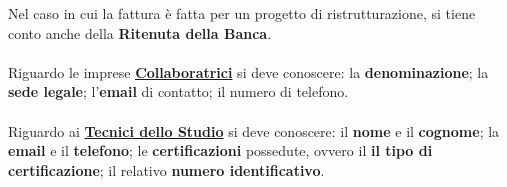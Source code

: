 \documentclass{elegantbook}
\begin{document}
	Nel caso in cui la fattura è fatta per un progetto di ristrutturazione, si tiene conto anche della \textbf{Ritenuta della Banca}.
	\\\\
	
	Riguardo le imprese \underline{\textbf{Collaboratrici}} si deve conoscere: la \textbf{denominazione}; la \textbf{sede legale};	l'\textbf{email} di contatto; il numero di telefono.
	\\\\
	
	Riguardo ai \underline{\textbf{Tecnici dello Studio}} si deve conoscere: il \textbf{nome} e il \textbf{cognome}; la
        \textbf{email} e il \textbf{telefono}; le \textbf{certificazioni} possedute, ovvero il \textbf{il tipo di certificazione};
        il relativo \textbf{numero identificativo}.
	
\end{document}

